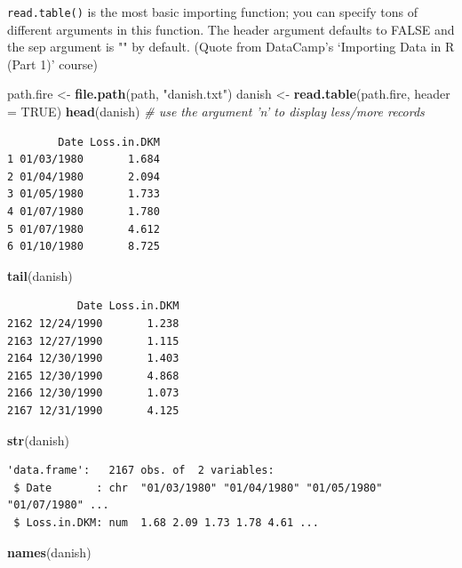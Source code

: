 \documentclass[
]{book}
\newenvironment{Shaded}{\begin{snugshade}}{\end{snugshade}}
\newcommand{\CommentTok}[1]{\textcolor[rgb]{0.56,0.35,0.01}{\textit{#1}}}
\newcommand{\DataTypeTok}[1]{\textcolor[rgb]{0.13,0.29,0.53}{#1}}
\newcommand{\KeywordTok}[1]{\textcolor[rgb]{0.13,0.29,0.53}{\textbf{#1}}}
\newcommand{\NormalTok}[1]{#1}
\newcommand{\OtherTok}[1]{\textcolor[rgb]{0.56,0.35,0.01}{#1}}
\newcommand{\StringTok}[1]{\textcolor[rgb]{0.31,0.60,0.02}{#1}}
\begin{document}
\texttt{read.table()} is the most basic importing function; you can specify tons of different arguments in this function. The header argument defaults to FALSE and the sep argument is "" by default. (Quote from DataCamp's `Importing Data in R (Part 1)' course)

\begin{Shaded}
\begin{Highlighting}[]
\NormalTok{path.fire <-}\StringTok{ }\KeywordTok{file.path}\NormalTok{(path, }\StringTok{"danish.txt"}\NormalTok{)}
\NormalTok{danish <-}\StringTok{ }\KeywordTok{read.table}\NormalTok{(path.fire, }\DataTypeTok{header =} \OtherTok{TRUE}\NormalTok{)}
\KeywordTok{head}\NormalTok{(danish) }\CommentTok{# use the argument 'n' to display less/more records}
\end{Highlighting}
\end{Shaded}

\begin{verbatim}
        Date Loss.in.DKM
1 01/03/1980       1.684
2 01/04/1980       2.094
3 01/05/1980       1.733
4 01/07/1980       1.780
5 01/07/1980       4.612
6 01/10/1980       8.725
\end{verbatim}

\begin{Shaded}
\begin{Highlighting}[]
\KeywordTok{tail}\NormalTok{(danish)}
\end{Highlighting}
\end{Shaded}

\begin{verbatim}
           Date Loss.in.DKM
2162 12/24/1990       1.238
2163 12/27/1990       1.115
2164 12/30/1990       1.403
2165 12/30/1990       4.868
2166 12/30/1990       1.073
2167 12/31/1990       4.125
\end{verbatim}

\begin{Shaded}
\begin{Highlighting}[]
\KeywordTok{str}\NormalTok{(danish)}
\end{Highlighting}
\end{Shaded}

\begin{verbatim}
'data.frame':	2167 obs. of  2 variables:
 $ Date       : chr  "01/03/1980" "01/04/1980" "01/05/1980" "01/07/1980" ...
 $ Loss.in.DKM: num  1.68 2.09 1.73 1.78 4.61 ...
\end{verbatim}

\begin{Shaded}
\begin{Highlighting}[]
\KeywordTok{names}\NormalTok{(danish)}
\end{Highlighting}
\end{Shaded}
\end{document}
